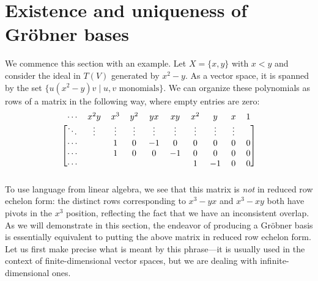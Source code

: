\section{Existence and uniqueness of Gr\"obner bases}\label{sec:rref}
We commence this section with an example. Let $X = \{x,y\}$ with $x<y$ and consider the ideal in $T(V)$ generated by $x^2 - y$. As a vector space, it is spanned by the set $\{u(x^2 - y)v \mid u,v\text{ monomials}\}$. We can organize these polynomials as rows of a matrix in the following way, where empty entries are zero:
\[
	\begin{blockarray}{cccccccccc}
	\cdots & x^2 y & x^3 & y^2 & yx & xy & x^2 & y & x & 1\\
	\begin{block}{[cccccccccc]}
	\ddots&\vdots& \vdots & \vdots& \vdots& \vdots& \vdots& \vdots& \vdots\\
	\cdots&&1 & 0 & -1 & 0 & 0 & 0 & 0 & 0\\
	\cdots&&1 & 0 & 0 & -1 & 0 & 0 & 0 & 0\\
	\cdots&& &  &  &  & 1 & -1 & 0 & 0\\
	\end{block}
	\end{blockarray}
\]
To use language from linear algebra, we see that this matrix is \emph{not} in reduced row echelon form: the distinct rows corresponding to $x^3 - yx$ and $x^3 - xy$ both have pivots in the $x^3$ position, reflecting the fact that we have an inconsistent overlap. As we will demonstrate in this section, the endeavor of producing a Gr\"obner basis is essentially equivalent to putting the above matrix in reduced row echelon form. Let us first make precise what is meant by this phrase---it is usually used in the context of finite-dimensional vector spaces, but we are dealing with infinite-dimensional ones.

